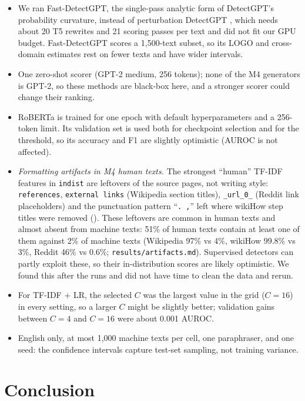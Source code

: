 \documentclass[11pt,a4paper]{article}
\begin{document}
\begin{itemize}
  \item We ran Fast-DetectGPT, the single-pass analytic form of DetectGPT's probability curvature, instead of
        perturbation DetectGPT \citep{mitchell23}, which needs about 20 T5 rewrites and 21 scoring passes per text and
        did not fit our GPU budget. Fast-DetectGPT scores a 1,500-text subset, so its LOGO and cross-domain
        estimates rest on fewer texts and have wider intervals.
  \item One zero-shot scorer (GPT-2 medium, 256 tokens); none of the M4 generators is GPT-2, so these methods are
        black-box here, and a stronger scorer could change their ranking.
  \item RoBERTa is trained for one epoch with default hyperparameters and a 256-token limit. Its validation set is
        used both for checkpoint selection and for the threshold, so its accuracy and F1 are slightly optimistic
        (AUROC is not affected).
  \item \emph{Formatting artifacts in M4 human texts.} The strongest ``human'' TF-IDF features in \texttt{indist}
        are leftovers of the source pages, not writing style: \texttt{references}, \texttt{external links}
        (Wikipedia section titles), \texttt{\_url\_0\_} (Reddit link placeholders) and the punctuation pattern
        ``\texttt{. ,}'' left where wikiHow step titles were removed ().
        These leftovers are common in human texts and almost absent from machine texts: 51\% of human texts contain
        at least one of them against 2\% of machine texts (Wikipedia 97\% vs 4\%, wikiHow 99.8\% vs 3\%, Reddit 46\%
        vs 0.6\%; \texttt{results/artifacts.md}).
        Supervised detectors can partly exploit these, so their in-distribution scores are likely optimistic. We
        found this after the runs and did not have time to clean the data and rerun.
  \item For TF-IDF + LR, the selected $C$ was the largest value in the grid ($C=16$) in every setting, so a larger
        $C$ might be slightly better; validation gains between $C=4$ and $C=16$ were about 0.001 AUROC.
  \item English only, at most 1,000 machine texts per cell, one paraphraser, and one seed: the confidence
        intervals capture test-set sampling, not training variance.
\end{itemize}

\section{Conclusion}
\end{document}

